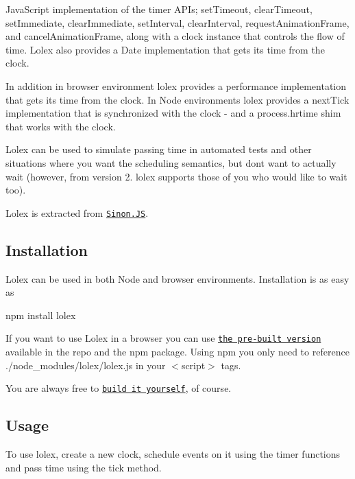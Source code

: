 Java\+Script implementation of the timer A\+P\+Is; {\ttfamily set\+Timeout}, {\ttfamily clear\+Timeout}, {\ttfamily set\+Immediate}, {\ttfamily clear\+Immediate}, {\ttfamily set\+Interval}, {\ttfamily clear\+Interval}, {\ttfamily request\+Animation\+Frame}, and {\ttfamily cancel\+Animation\+Frame}, along with a clock instance that controls the flow of time. Lolex also provides a {\ttfamily Date} implementation that gets its time from the clock.

In addition in browser environment lolex provides a {\ttfamily performance} implementation that gets its time from the clock. In Node environments lolex provides a {\ttfamily next\+Tick} implementation that is synchronized with the clock -\/ and a {\ttfamily process.\+hrtime} shim that works with the clock.

Lolex can be used to simulate passing time in automated tests and other situations where you want the scheduling semantics, but don\textquotesingle{}t want to actually wait (however, from version 2. lolex supports those of you who would like to wait too).

Lolex is extracted from \href{https://github.com/sinonjs/sinon.js}{\tt Sinon.\+JS}.

\subsection*{Installation}

Lolex can be used in both Node and browser environments. Installation is as easy as


\begin{DoxyCode}
npm install lolex
\end{DoxyCode}


If you want to use Lolex in a browser you can use \href{https://github.com/sinonjs/lolex/blob/master/lolex.js}{\tt the pre-\/built version} available in the repo and the npm package. Using npm you only need to reference {\ttfamily ./node\+\_\+modules/lolex/lolex.js} in your {\ttfamily $<$script$>$} tags.

You are always free to \href{https://github.com/sinonjs/lolex/blob/53ea4d9b9e5bcff53cc7c9755dc9aa340368cf1c/package.json#L22}{\tt build it yourself}, of course.

\subsection*{Usage}

To use lolex, create a new clock, schedule events on it using the timer functions and pass time using the {\ttfamily tick} method.


